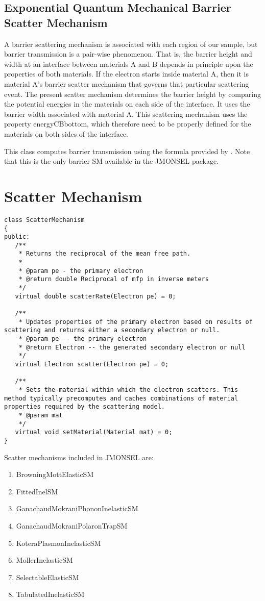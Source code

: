 \subsection{Exponential Quantum Mechanical Barrier Scatter Mechanism}
A barrier scattering mechanism is associated with each region of our sample, but barrier transmission is a pair-wise phenomenon. That is, the barrier height and width at an interface between materials A and B depends in principle upon the properties of both materials. If the electron starts inside material A, then it is material A's barrier scatter mechanism that governs that particular scattering event. The present scatter mechanism determines the barrier height by comparing the potential energies in the materials on each side of the interface. It uses the barrier width associated with material A. This scattering mechanism uses the property energyCBbottom, which therefore need to be properly defined for the materials on both sides of the interface.

This class computes barrier transmission using the formula provided by \cite{Landau}. Note that this is the only barrier SM available in the JMONSEL package. 

\section{Scatter Mechanism}\label{impl:sm}
\begin{lstlisting}
class ScatterMechanism
{
public:
   /**
    * Returns the reciprocal of the mean free path.
    *
    * @param pe - the primary electron
    * @return double Reciprocal of mfp in inverse meters
    */
   virtual double scatterRate(Electron pe) = 0;

   /**
    * Updates properties of the primary electron based on results of scattering and returns either a secondary electron or null.
    * @param pe -- the primary electron
    * @return Electron -- the generated secondary electron or null
    */
   virtual Electron scatter(Electron pe) = 0;

   /**
    * Sets the material within which the electron scatters. This method typically precomputes and caches combinations of material properties required by the scattering model.
    * @param mat
    */
   virtual void setMaterial(Material mat) = 0;
}
\end{lstlisting}

Scatter mechanisms included in JMONSEL are:
\begin{enumerate}
\item BrowningMottElasticSM
\item FittedInelSM
\item GanachaudMokraniPhononInelasticSM
\item GanachaudMokraniPolaronTrapSM
\item KoteraPlasmonInelasticSM
\item MollerInelasticSM
\item SelectableElasticSM
\item TabulatedInelasticSM
\end{enumerate}


